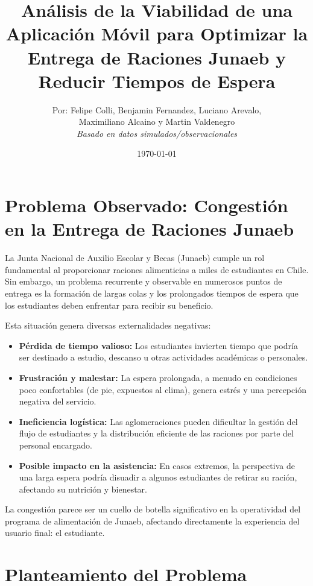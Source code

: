 \documentclass[11pt, a4paper]{article}
\title{Análisis de la Viabilidad de una Aplicación Móvil para Optimizar la Entrega de Raciones Junaeb y Reducir Tiempos de Espera}
\author{Por: Felipe Colli, Benjamin Fernandez, Luciano Arevalo, \\ Maximiliano Alcaino y Martin Valdenegro \\ \textit{Basado en datos simulados/observacionales}}
\date{\today}
\begin{document}
\maketitle
\thispagestyle{empty} %
\newpage

\tableofcontents %
\newpage

\section{Problema Observado: Congestión en la Entrega de Raciones Junaeb}
\label{sec:problema}

La Junta Nacional de Auxilio Escolar y Becas (Junaeb) cumple un rol fundamental al proporcionar raciones alimenticias a miles de estudiantes en Chile. Sin embargo, un problema recurrente y observable en numerosos puntos de entrega es la formación de largas colas y los prolongados tiempos de espera que los estudiantes deben enfrentar para recibir su beneficio.

Esta situación genera diversas externalidades negativas:
\begin{itemize}
    \item \textbf{Pérdida de tiempo valioso:} Los estudiantes invierten tiempo que podría ser destinado a estudio, descanso u otras actividades académicas o personales.
    \item \textbf{Frustración y malestar:} La espera prolongada, a menudo en condiciones poco confortables (de pie, expuestos al clima), genera estrés y una percepción negativa del servicio.
    \item \textbf{Ineficiencia logística:} Las aglomeraciones pueden dificultar la gestión del flujo de estudiantes y la distribución eficiente de las raciones por parte del personal encargado.
    \item \textbf{Posible impacto en la asistencia:} En casos extremos, la perspectiva de una larga espera podría disuadir a algunos estudiantes de retirar su ración, afectando su nutrición y bienestar.
\end{itemize}
La congestión parece ser un cuello de botella significativo en la operatividad del programa de alimentación de Junaeb, afectando directamente la experiencia del usuario final: el estudiante.

\section{Planteamiento del Problema}
\label{sec:planteamiento}
\end{document}
